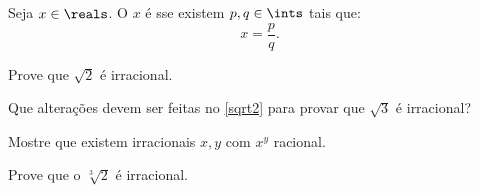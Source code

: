 \begin{definition}
    Seja $x\in\reals$. O $x$ é  sse existem $p,q \in\ints$ tais que:
    $$
        x = \frac p q.
    $$
\end{definition}

\begin{exercise}
\label{sqrt2}%
%
    Prove que $\sqrt 2$ é irracional.
\end{exercise}

\begin{exercise}
    Que alterações devem ser feitas no \ref{sqrt2} para provar que $\sqrt 3$ é irracional?
\end{exercise}

\begin{exercise}
    Mostre que existem irracionais $x,y$ com $x^y$ racional.
\end{exercise}

\begin{homework}
    Prove que o $\sqrt[3] 2$ é irracional.
\end{homework}
